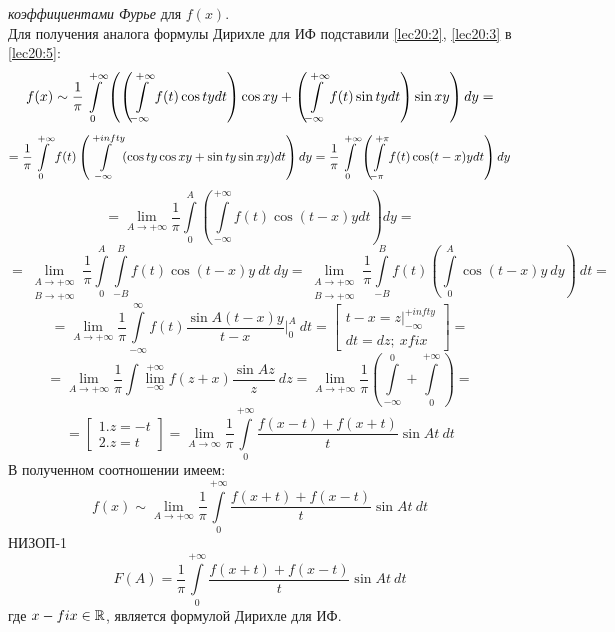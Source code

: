 \documentclass[../../main.tex]{subfiles}
\begin{document}
\emph{коэффициентами Фурье} для $ f(x) $.\\
Для получения аналога формулы Дирихле для ИФ подставили
\eqref{lec20:2}, \eqref{lec20:3} в \eqref{lec20:5}:
\[
f(x) \sim \dfrac{1}{\pi} \int\limits_{0}^{+\infty}
\left(
\left(\int\limits_{-\infty}^{+\infty} f(t) \cos ty dt\right) \cos xy +
\left(
\int\limits_{-\infty}^{+\infty} f(t) \sin ty dt
\right) \sin xy 
\right) dy = \] \[ =
\dfrac{1}{\pi}
\int\limits_{0}^{+\infty} f(t) \left(
\int\limits_{-\infty}^{+infty} (\cos ty\cos xy + \sin ty\sin xy) dt
\right) dy =
\dfrac{1}{\pi} \int\limits_{0}^{+\infty} \left(
\int\limits_{-\pi}^{+\pi} f(t) \cos(t - x)ydt
\right) dy \] \[ =
\lim\limits_{A \to +\infty} \dfrac{1}{\pi}
\int\limits_0^{A} \left(
\int\limits_{-\infty}^{+\infty}
f(t) \cos(t - x)ydt
\right) dy =
\] \[ = 
\lim\limits_{\substack{A \to +\infty \\ B \to +\infty}} \dfrac{1}{\pi}
\int\limits_0^A \int\limits_{-B}^B f(t) \cos(t-x)y\ dt\ dy =
\lim\limits_{\substack{A \to +\infty \\ B \to +\infty}}
\dfrac{1}{\pi} \int\limits_{-B}^B f(t) \left(
\int\limits_0^A
 \cos (t - x) y\ dy \right)\ dt =
\] \[ = 
\lim\limits_{A \to +\infty} \dfrac{1}{\pi}
\int\limits_{-\infty}^{\infty} f(t) 
\dfrac{\sin A(t - x)y}{t - x}|_0^A\ dt = 
\begin{bmatrix}
t - x = z |_{-\infty}^{+infty}\\
dt = dz;\ x fix
\end{bmatrix} =
\] \[ = 
\lim\limits_{A \to +\infty} \dfrac{1}{\pi} 
\int\lim\limits_{-\infty}^{+\infty} f(z + x)
\dfrac{\sin Az}{z}\ dz =
\lim\limits_{A \to +\infty} \dfrac{1}{\pi}
\left(
\int\limits_{-\infty}^{0} + 
\int\limits_{0}^{+\infty}
\right) =
\] \[ = 
\begin{bmatrix}
1. z = -t \\
2. z = t
\end{bmatrix} =
\lim\limits_{A \to \infty} \dfrac{1}{\pi}
\int\limits_{0}^{+\infty}
\dfrac{f(x - t) + f(x + t)}{t} \sin At\ dt
\]
В полученном соотношении имеем:
\begin{equation}
\label{lec20:6}
	f(x) \sim \lim\limits_{A \to +\infty} \dfrac{1}{\pi} 
	\int\limits_0^{+\infty} \dfrac{f(x + t) + f(x - t)}{t} \sin At\ dt
\end{equation}
НИЗОП-1
\begin{equation}
\label{lec20:7}
	F(A) = \dfrac{1}{\pi} \int\limits_0^{+\infty} 
	\dfrac{f(x + t) + f(x - t)}{t} \sin At\ dt
\end{equation}
где $ x - fix \in \mathbb{R} $, является формулой Дирихле для ИФ.
\end{document}
